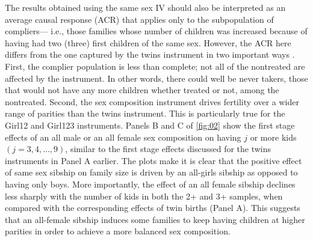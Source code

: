 The results obtained using the same sex IV should also be interpreted as an average causal response (ACR) that applies only to the subpopulation of compliers--- i.e., those families whose number of children was increased because of having had two (three) first children of the same sex. However, the ACR here differs from the one captured by the twins instrument in two important ways \parencite{angrist_multiple_2010}. First, the complier population is less than complete; not all of the nontreated are affected by the instrument. In other words, there could well be never takers, those that would not have any more children whether treated or not, among the nontreated. Second, the sex composition instrument drives fertility over a wider range of parities than the twins instrument. This is particularly true for the Girl12 and Girl123 instruments. Panels B and C of \autoref{fig:02} show the first stage effects of an all male or an all female sex composition on having $ j $ or more kids $ (j = 3, 4, \dots, 9) $, similar to the first stage effects discussed for the twins instruments in Panel A earlier. The plots make it is clear that the positive effect of same sex sibship on family size is driven by an all-girls sibship as opposed to having only boys. More importantly, the effect of an all female sibship declines less sharply with the number of kids in both the 2+ and 3+ samples, when compared with the corresponding effects of twin births (Panel A). This suggests that an all-female sibship induces some families to keep having children at higher parities in order to achieve a more balanced sex composition. 







